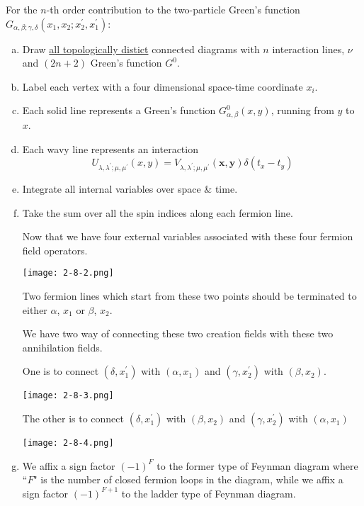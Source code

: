 For the $n$-th order contribution to the two-particle Green's function $G_{\alpha,\beta;\gamma,\delta}(x_1,x_2;x_2^{'},x_1^{'})$:
\begin{enumerate}[(a)]
\item Draw \underline{all topologically distict} connected diagrams with $n$ interaction lines, $\nu$ and $(2n+2)$ Green's function $G^0$.
\item Label each vertex with a four dimensional space-time coordinate $x_i$.
\item Each solid line represents a Green's function $G^0_{\alpha,\beta}(x,y)$, running from $y$ to $x$.
\item Each wavy line represents an interaction
\[U_{\lambda,\lambda^{'};\mu,\mu^{'}}(x,y) = V_{\lambda,\lambda^{'};\mu,\mu^{'}}(\mathbf{x},\mathbf{y}) \delta(t_x-t_y)\]
\item Integrate all internal variables over space \& time.
\item Take the sum over all the spin indices along each fermion line.

Now that we have four external variables associated with these four fermion field operators.

\begin{center} \label{Fig2.8.2}
\texttt{[image: 2-8-2.png]}
\end{center}

Two fermion lines which start from these two points should be terminated to either $\alpha$, $x_1$ or $\beta$, $x_2$.

We have two way of connecting these two creation fields with these two annihilation fields.

One is to connect $(\delta,x_1^{'})$ with $(\alpha,x_1)$ and $(\gamma,x_2^{'})$ with $(\beta,x_2)$.

\begin{center} \label{Fig2.8.3}
\texttt{[image: 2-8-3.png]}
\end{center}

The other is to connect $(\delta,x_1^{'})$ with $(\beta,x_2)$ and $(\gamma,x_2^{'})$ with $(\alpha,x_1)$

\begin{center} \label{Fig2.8.4}
\texttt{[image: 2-8-4.png]}
\end{center}

\item We affix a sign factor $(-1)^F$ to the former type of Feynman diagram where ``$F$" is the number of closed fermion loops in the diagram, while we affix a sign factor $(-1)^{F+1}$ to the ladder type of Feynman diagram.


\end{enumerate}
